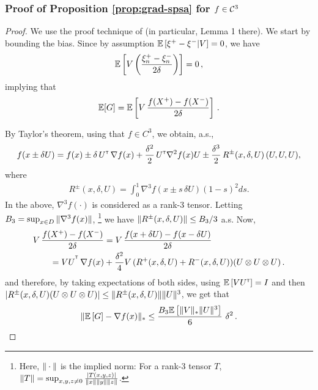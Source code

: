 \subsubsection*{Proof of Proposition \ref{prop:grad-spsa} for $f \in \mathcal{C}^3$}
\begin{proof}
We use the proof technique of \cite{spall1992multivariate}
  (in particular, Lemma 1 there).
We start by bounding the bias.
Since by assumption $\mathbb{E}\left[ \xi^+-\xi^-|V\right]=0$, we have
\begin{align*}
\mathbb{E}\left[  V\left(\dfrac{\xi_n^+ - \xi_n^-}{2\delta}\right) \right]= 0\,,
\end{align*}
implying that
\begin{align*}
\mathbb{E}[G] =  \mathbb{E}\left[V\,  \dfrac{f(X^+)  -f(X^-)}{2\delta} \right]\,.
\end{align*}

By Taylor's theorem, using that $f\in C^3$, we obtain, a.s.,
\begin{align*}
f(x \pm \delta U) =
 f(x)
 \pm\delta\,  U^\mathsf{\scriptscriptstyle T}\,\nabla f(x)
  + \frac{\delta^2}{2}\, U^\mathsf{\scriptscriptstyle T} \nabla^2 f(x) U
  \pm  \frac{\delta^3}{2} \, R^{\pm}(x,\delta,U) \,(U, U, U),
\end{align*}
where
\begin{align}
 R^{\pm}(x,\delta,U)= \int_0^1  \nabla^3 f(  x \pm s \, \delta U ) (1-s)^2 ds. \label{eq:taylor-r}
\end{align}
In the above, $\nabla^3 f(\cdot)$ is considered as a rank-3 tensor.
Letting $B_3 = \sup_{x\in D} \| \nabla^3 f(x) \|$,%
\footnote{Here, $\|\cdot\|$ is the implied norm: For a rank-3 tensor $T$, $\|T\| = \sup_{x,y,z\ne 0}
\frac{|T (x,y,z)|}{\|x\|\|y\|\|z\|}$.
}
we have $\| R^{\pm}(x,\delta,U)\| \le B_3/3$ a.s.
Now,
\begin{align}
\begin{split}
\MoveEqLeft       V\, \dfrac{f(X^+)-f(X^-)}{2\delta}
  = V\, \dfrac{f(x+\delta U) - f(x-\delta U)}{2\delta} \\
&= VU^{\tr}
\, \nabla f(x)   +   \frac{\delta^2}{4}  V \,(R^{+}(x,\delta,U)+R^{-}(x,\delta,U))(U \otimes U \otimes U)\,.
\end{split}
\label{eq:l1}
\end{align}
and therefore,
by taking expectations of both sides,
using $\mathbb{E}\left[V U^\mathsf{\scriptscriptstyle T}\right] = I$ and then $|R^{\pm}(x,\delta,U) (U \otimes U \otimes U)| \le
\|R^{\pm}(x,\delta,U)\| \|U\|^3$,
we get that
\begin{align*}
\| \mathbb{E}\left[ G \right] - \nabla f(x) \|_*
\le \frac{B_3 \mathbb{E}\left[ \|V\|_* \|U\|^3 \right]}{6}\,\, \delta^2 \,.
\end{align*}


\end{proof}
